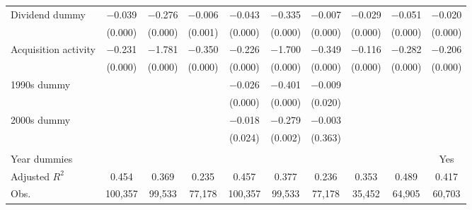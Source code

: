 {\begin{longtable}{l*{9}{c}}
\addlinespace
Dividend dummy      &    $-$0.039&    $-$0.276&    $-$0.006&    $-$0.043&    $-$0.335&    $-$0.007&    $-$0.029&    $-$0.051&    $-$0.020\\
                    &     (0.000)&     (0.000)&     (0.001)&     (0.000)&     (0.000)&     (0.000)&     (0.000)&     (0.000)&     (0.000)\\
\addlinespace
Acquisition activity&    $-$0.231&    $-$1.781&    $-$0.350&    $-$0.226&    $-$1.700&    $-$0.349&    $-$0.116&    $-$0.282&    $-$0.206\\
                    &     (0.000)&     (0.000)&     (0.000)&     (0.000)&     (0.000)&     (0.000)&     (0.000)&     (0.000)&     (0.000)\\
\addlinespace
1990s dummy         &            &            &            &    $-$0.026&    $-$0.401&    $-$0.009&            &            &            \\
                    &            &            &            &     (0.000)&     (0.000)&     (0.020)&            &            &            \\
\addlinespace
2000s dummy         &            &            &            &    $-$0.018&    $-$0.279&    $-$0.003&            &            &            \\
                    &            &            &            &     (0.024)&     (0.002)&     (0.363)&            &            &            \\
\\
Year dummies        &            &            &            &            &            &            &            &            &         Yes\\
Adjusted $ R^2$     &       0.454&       0.369&       0.235&       0.457&       0.377&       0.236&       0.353&       0.489&       0.417\\
Obs.                &     100,357&      99,533&      77,178&     100,357&      99,533&      77,178&      35,452&      64,905&      60,703\\
\bottomrule
\end{longtable}
}
